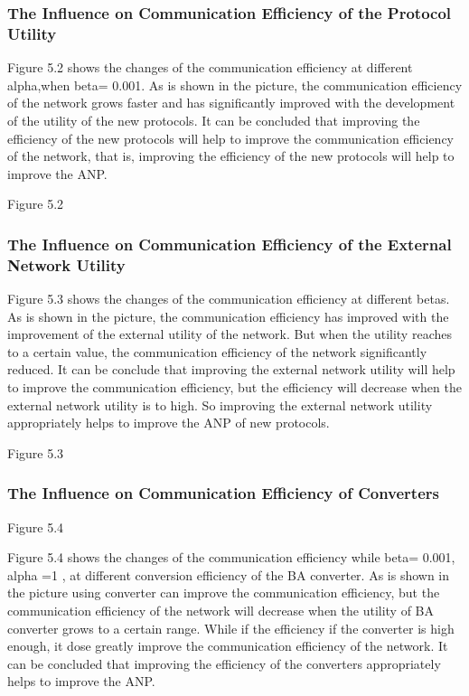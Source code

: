 \documentclass{article}
\begin{document}
\subsubsection{The Influence on Communication Efficiency  of the Protocol Utility}
Figure 5.2 shows the changes of the communication efficiency at different alpha,when beta= 0.001. As is shown in the picture,
the communication efficiency of the network grows faster and has significantly improved with the development of the utility
of the new protocols. It can be concluded that improving the efficiency of the new protocols will help to improve the communication
efficiency of the network, that is, improving the efficiency of the new protocols will help to improve the ANP.

Figure 5.2

\subsubsection{The Influence on Communication Efficiency of the External Network Utility}
Figure 5.3 shows the changes of the communication efficiency at different betas. As is shown in the picture, the communication
efficiency has improved with the improvement of the external utility of the network. But when the utility reaches to a certain
value, the communication efficiency of the network significantly reduced. It can be conclude that improving the external
network utility will help to improve the communication efficiency, but the efficiency will decrease when the external
network utility is to high. So improving the external network utility appropriately helps to improve the ANP of new protocols.

Figure 5.3

\subsubsection{The Influence on Communication Efficiency of Converters}
Figure 5.4

Figure 5.4 shows the changes of the communication efficiency while beta= 0.001, alpha =1 , at different conversion efficiency of
the BA converter. As is shown in the picture using converter can improve the communication efficiency, but the communication efficiency
of the network will decrease when the utility of BA converter grows to a certain range. While if the efficiency if the converter is
high enough, it dose greatly improve the communication efficiency of the network. It can be concluded that improving the efficiency
of the converters appropriately helps to improve the ANP.
\end{document}
